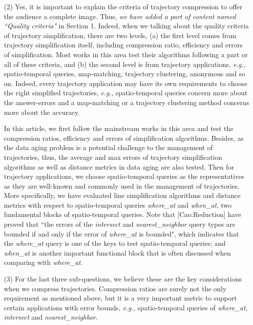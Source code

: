 \documentclass{letter}
\newcommand{\eg}{\emph{e.g.,}\xspace}
\begin{document}
(2) {Yes, it is important to explain the criteria of trajectory compression to offer the audience a complete image.} Thus, \emph{we have added a part of content named ``Quality criteria"} in Section 1. Indeed, when we talking about the quality criteria of trajectory simplification, there are two levels,
(a) the first level comes from trajectory simplification itself, including compression ratio, efficiency and errors of simplification. Most works in this area test their algorithms following a part or all of these criteria, and
(b) the second level is from trajectory applications, \eg spatio-temporal queries, map-matching, trajectory clustering, anonymous and so on. Indeed, every trajectory application may have its own requirements to choose the right simplified trajectories, \eg spatio-temporal queries concern more about the answer-errors and a map-matching or a trajectory clustering method concerns more about the accuracy.

In this article, we first follow the mainstream works in this area and test the compression ratios, efficiency and errors of simplification algorithms.
Besides, as the data aging problem is a potential challenge to the management of trajectories, thus, the average and max errors of trajectory simplification algorithms as well as distance metrics in data aging are also tested.
%
Then for trajectory applications, we choose spatio-temporal queries as the representatives as they are well-known and commonly used in the management of trajectories.
More specifically, we have evaluated line simplification algorithms and distance metrics with respect to spatio-temporal queries \emph{where\_at} and \emph{when\_at}, two fundamental blocks of spatio-temporal queries. Note that [Cao:Reduction] have proved that ``the errors of the \emph{intersect} and \emph{nearest\_neighbor} query types are bounded if and only if the error of \emph{where\_at} is bounded", which indicates that the \emph{where\_at} query is one of the keys to test spatio-temporal queries; and \emph{when\_at} is another important functional block that is often discussed when comparing with \emph{where\_at}.

(3) For the last three sub-questions, we believe these are the key considerations when we compress trajectories. Compression ratios are surely not the only requirement as mentioned above, but it is a very important metric to support certain applications with error bounds, \eg spatio-temporal queries of \emph{where\_at}, \emph{intersect} and \emph{nearest\_neighbor}.
\end{document}
